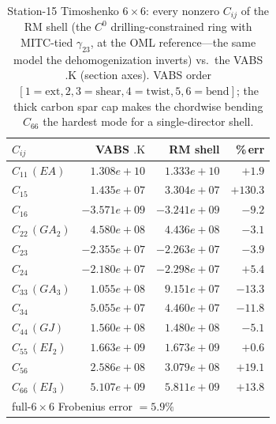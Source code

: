 \begin{table}[htpb]\centering\small
\caption{Station-15 Timoshenko $6\times6$: every nonzero $C_{ij}$ of the RM shell (the $C^0$ drilling-constrained ring with MITC-tied $\gamma_{23}$, at the OML reference---the same model the dehomogenization inverts) vs.\ the VABS $.\mathrm{K}$ (section axes). VABS order $[1\!=\!\mathrm{ext},2,3\!=\!\mathrm{shear},4\!=\!\mathrm{twist},5,6\!=\!\mathrm{bend}]$; the thick carbon spar cap makes the chordwise bending $C_{66}$ the hardest mode for a single-director shell.}\label{tab:st15_homo}
\begin{tabular}{lrrr}
\toprule
$C_{ij}$ & VABS $.\mathrm{K}$ & RM shell & \%\,err \\
\midrule
$C_{11}\,(EA)$ & $1.308e+10$ & $1.333e+10$ & $+1.9$ \\
$C_{15}$ & $1.435e+07$ & $3.304e+07$ & $+130.3$ \\
$C_{16}$ & $-3.571e+09$ & $-3.241e+09$ & $-9.2$ \\
$C_{22}\,(GA_2)$ & $4.580e+08$ & $4.436e+08$ & $-3.1$ \\
$C_{23}$ & $-2.355e+07$ & $-2.263e+07$ & $-3.9$ \\
$C_{24}$ & $-2.180e+07$ & $-2.298e+07$ & $+5.4$ \\
$C_{33}\,(GA_3)$ & $1.055e+08$ & $9.151e+07$ & $-13.3$ \\
$C_{34}$ & $5.055e+07$ & $4.460e+07$ & $-11.8$ \\
$C_{44}\,(GJ)$ & $1.560e+08$ & $1.480e+08$ & $-5.1$ \\
$C_{55}\,(EI_2)$ & $1.663e+09$ & $1.673e+09$ & $+0.6$ \\
$C_{56}$ & $2.586e+08$ & $3.079e+08$ & $+19.1$ \\
$C_{66}\,(EI_3)$ & $5.107e+09$ & $5.811e+09$ & $+13.8$ \\
\midrule
\multicolumn{4}{l}{\small full-$6\times6$ Frobenius error $=5.9\%$} \\
\bottomrule
\end{tabular}
\end{table}